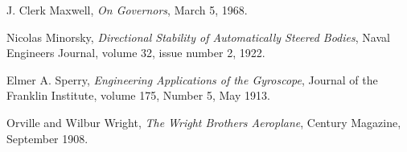 \begin{thebibliography}{9}
    J. Clerk Maxwell,
    \emph{On Governors},
    March 5, 1968.


    Nicolas Minorsky,
    \emph{Directional Stability of Automatically Steered Bodies},
    Naval Engineers Journal,
    volume 32,
    issue number 2,
    1922.


    Elmer A. Sperry,
    \emph{Engineering Applications of the Gyroscope},
    Journal of the Franklin Institute,
    volume 175,
    Number 5,
    May 1913.


    Orville and Wilbur Wright,
    \emph{The Wright Brothers Aeroplane},
    Century Magazine,
    September 1908.



\end{thebibliography}

